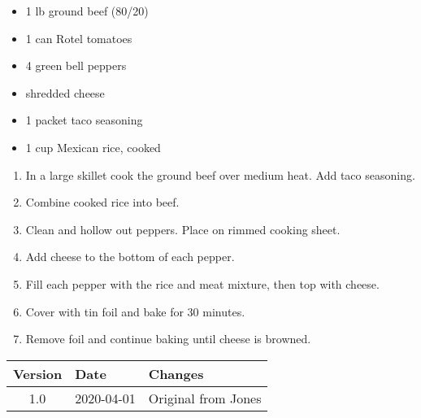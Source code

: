 
\ingredients
\begin{multicols}{2}
\raggedcolumns %
\begin{itemize}
    \item 1 lb ground beef (80/20)
    \item 1 can Rotel tomatoes
    \item 4 green bell peppers
    \item {} shredded cheese
    \item 1 packet taco seasoning
    \item 1 cup Mexican rice, cooked
\end{itemize}
\end{multicols}

\instructions
\begin{enumerate}
    \item In a large skillet cook the ground beef over medium heat. Add taco seasoning.
    \item Combine cooked rice into beef.
    \item Clean and hollow out peppers. Place on rimmed cooking sheet.
    \item Add cheese to the bottom of each pepper.
    \item Fill each pepper with the rice and meat mixture, then top with cheese.
    \item Cover with tin foil and bake for 30 minutes.
    \item Remove foil and continue baking until cheese is browned.
\end{enumerate}

\vfill

\begin{tabular}{ c | l | l }
  \textbf{Version} & \textbf{Date} & \textbf{Changes} \\ 
  \hline		
  1.0 & 2020-04-01 & Original from Jones \\
\end{tabular}
